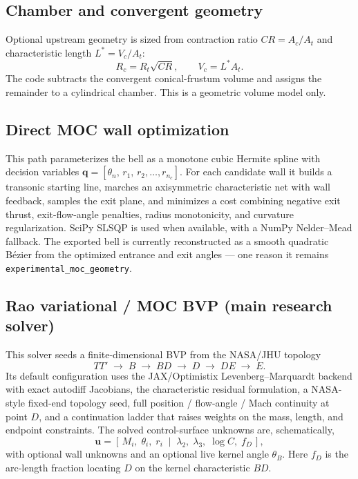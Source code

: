 \documentclass[11pt]{article}
\newcommand{\code}[1]{\texttt{#1}}
\begin{document}
\subsection{Chamber and convergent geometry}

Optional upstream geometry is sized from contraction ratio $CR=A_c/A_t$ and
characteristic length $L^*=V_c/A_t$:
\begin{equation}
R_c=R_t\sqrt{CR},
\qquad
V_c=L^* A_t .
\end{equation}
The code subtracts the convergent conical-frustum volume and assigns the
remainder to a cylindrical chamber. This is a geometric volume model only.

\subsection{Direct MOC wall optimization}

This path parameterizes the bell as a monotone cubic Hermite spline with
decision variables $\mathbf{q}=[\theta_n,\,r_1,\,r_2,\dots,r_{n_c}]$. For
each candidate wall it builds a transonic starting line, marches an
axisymmetric characteristic net with wall feedback, samples the exit plane,
and minimizes a cost combining negative exit thrust, exit-flow-angle
penalties, radius monotonicity, and curvature regularization. SciPy SLSQP is
used when available, with a NumPy Nelder--Mead fallback. The exported bell is
currently reconstructed as a smooth quadratic B\'ezier from the optimized
entrance and exit angles --- one reason it remains
\code{experimental\_moc\_geometry}.

\subsection{Rao variational / MOC BVP (main research solver)}

This solver seeds a finite-dimensional BVP from the NASA/JHU topology
\begin{equation}
T T' \;\rightarrow\; B \;\rightarrow\; BD \;\rightarrow\; D \;\rightarrow\; DE \;\rightarrow\; E .
\end{equation}
Its default configuration uses the JAX/Optimistix Levenberg--Marquardt
backend with exact autodiff Jacobians, the characteristic residual
formulation, a NASA-style fixed-end topology seed, full position /
flow-angle / Mach continuity at point $D$, and a continuation ladder that
raises weights on the mass, length, and endpoint constraints. The solved
control-surface unknowns are, schematically,
\begin{equation}
\mathbf{u}=\left[\,M_i,\;\theta_i,\;r_i \;\middle|\;
\lambda_2,\;\lambda_3,\;\log C,\;f_D\,\right],
\end{equation}
with optional wall unknowns and an optional live kernel angle $\theta_B$.
Here $f_D$ is the arc-length fraction locating $D$ on the kernel
characteristic $BD$.
\end{document}
